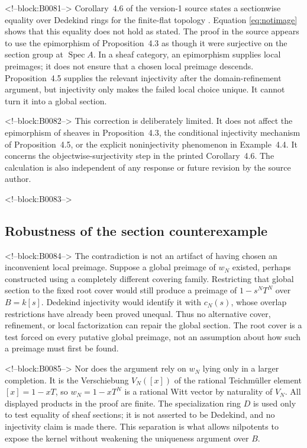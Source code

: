 \documentclass[11pt]{article}
\theoremstyle{definition}
\newcommand{\Spec}{\operatorname{Spec}}
\begin{document}
<!--block:B0081-->
Corollary~4.6 of the version-1 source states a sectionwise equality over
Dedekind rings for the finite-flat topology
\cite[p.~23]{Deninger2025Rational}.  Equation \eqref{eq:notimage} shows
that this equality does not hold as stated.  The proof in the source
appears to use the epimorphism of Proposition~4.3 as though it were
surjective on the section group at \(\Spec A\).  In a sheaf category, an
epimorphism supplies local preimages; it does not ensure that a chosen
local preimage descends.  Proposition~4.5 supplies the relevant
injectivity after the domain-refinement argument, but injectivity only
makes the failed local choice unique.  It cannot turn it into a global
section.

<!--block:B0082-->
This correction is deliberately limited.  It does not affect the
epimorphism of sheaves in Proposition~4.3, the conditional injectivity
mechanism of Proposition~4.5, or the explicit noninjectivity phenomenon in
Example~4.4.  It concerns the objectwise-surjectivity step in the printed
Corollary~4.6.  The calculation is also independent of any response or
future revision by the source author.

<!--block:B0083-->
\subsection{Robustness of the section counterexample}

<!--block:B0084-->
The contradiction is not an artifact of having chosen an inconvenient
local preimage.  Suppose a global preimage of \(w_N\) existed, perhaps
constructed using a completely different covering family.  Restricting
that global section to the fixed root cover would still produce a preimage
of \(1-s^NT^N\) over \(B=k[s]\).  Dedekind injectivity would identify it
with \(c_N(s)\), whose overlap restrictions have already been proved
unequal.  Thus no alternative cover, refinement, or local factorization can
repair the global section.  The root cover is a test forced on every
putative global preimage, not an assumption about how such a preimage must
first be found.

<!--block:B0085-->
Nor does the argument rely on \(w_N\) lying only in a larger completion.
It is the Verschiebung \(V_N([x])\) of the rational Teichm\"uller element
\([x]=1-xT\), so \(w_N=1-xT^N\) is a rational Witt vector by naturality of
\(V_N\).  All displayed products in the proof are finite.  The
specialization ring \(D\) is used only to test equality of sheaf sections;
it is not asserted to be Dedekind, and no injectivity claim is made there.
This separation is what allows nilpotents to expose the kernel without
weakening the uniqueness argument over \(B\).
\end{document}
